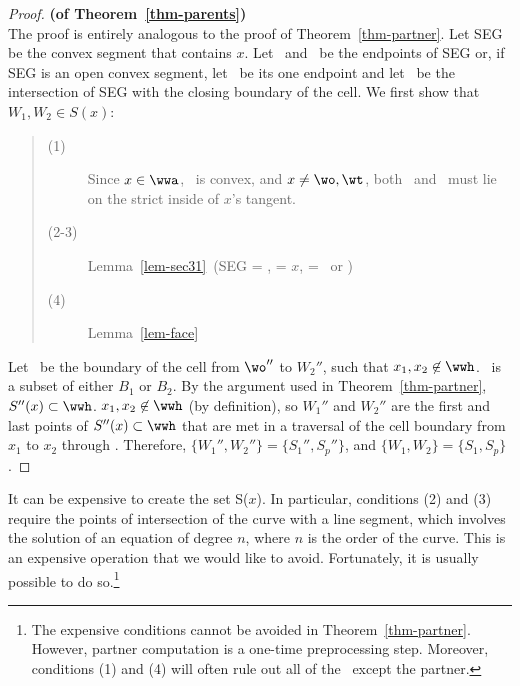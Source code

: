 %
\begin{proof}{\bf (of Theorem~\ref{thm-parents})  }\\
The proof is entirely analogous to the proof of Theorem~\ref{thm-partner}.
Let SEG be the convex segment that contains $x$.
Let \wo\ and \wt\ be the endpoints of SEG or,
if SEG is an open convex segment, let \wo\ be its one endpoint and
let \wt\ be the intersection of SEG with the closing boundary of the cell.
We first show that $W_{1},W_{2} \in S(x)$:\nopagebreak
\begin{quote}
\begin{description}
   \item[(1)] Since $x \in \wwa$, \wwa\ is convex, and $x \neq \wo,\wt$,
both \wo\ and \wt\ must lie on the strict inside of $x$'s tangent.
    \item[(2-3)] Lemma~\ref{lem-sec31}\ (SEG = \wwa, \x = $x$, \y = \wo\ or \wt)
    \item[(4)] Lemma~\ref{lem-face}
\end{description}
\end{quote}
Let \wwh\ be the boundary of the cell
from $\wo ''$ to $W_{2}''$, 
such that \mbox{$x_{1},x_{2} \not\in \wwh$}.
\wwh\ is a subset of either $B_{1}$ or $B_{2}$.
By the argument used in Theorem~\ref{thm-partner}, $S''(x) \subset \wwh$.
\mbox{$x_{1},x_{2} \not\in \wwh$}
(by definition), so $W_{1}''$ and $W_{2}''$ are the first and last points of
$S''(x) \subset \wwh$ that 
are met in a traversal of the cell boundary 
from $x_{1}$ to $x_{2}$ through \wwh.
Therefore, $\{W_{1}'',W_{2}'' \} = \{ S_{1}'',S_{p}'' \}$, and
$\{W_{1},W_{2} \} = \{ S_{1},S_{p} \}$.
\end{proof}
%

It can be expensive to create the set S($x$).
In particular, conditions (2) and (3) require the points of intersection
of the curve with a line segment,
which involves the solution of an equation of degree $n$, where $n$
is the order of the curve.
This is an expensive operation that we would like to avoid.
Fortunately, it is usually possible to do so.\footnote{The expensive 
conditions cannot be avoided in Theorem~\ref{thm-partner}.
However, partner computation is a one-time preprocessing step.
Moreover, conditions (1) and (4) will often rule out all of the
\wallpoints\ except the partner.}

